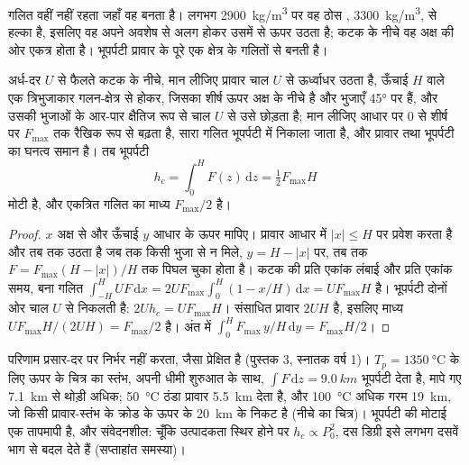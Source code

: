 गलित वहीं नहीं रहता जहाँ वह बनता है। लगभग \qty{2900}{kg/m^3} पर वह
ठोस , \qty{3300}{kg/m^3}, से हल्का है, इसलिए वह अपने
अवशेष से अलग होकर उसमें से ऊपर उठता है; कटक के नीचे वह अक्ष की ओर एकत्र होता है।
भूपर्पटी प्रावार के पूरे एक क्षेत्र के गलितों से बनती है।

\begin{proposition}[त्रिभुजाकार गलन-क्षेत्र की भूपर्पटी]\label{prop:b2:mantle-melting:triangle}
अर्ध-दर $U$ से फैलते कटक के नीचे, मान लीजिए प्रावार
चाल $U$ से ऊर्ध्वाधर उठता है, ऊँचाई $H$ वाले एक त्रिभुजाकार गलन-क्षेत्र से होकर, जिसका शीर्ष ऊपर
अक्ष के नीचे है और भुजाएँ \ang{45} पर हैं, और उसकी भुजाओं के आर-पार क्षैतिज रूप से चाल $U$ से
उसे छोड़ता है; मान लीजिए  आधार पर $0$ से शीर्ष पर
$F_{\max}$ तक रैखिक रूप से बढ़ता है, सारा गलित भूपर्पटी में निकाला जाता है, और प्रावार तथा
भूपर्पटी का घनत्व समान है। तब भूपर्पटी
\[
  h_c = \int_0^H F(z)\,\mathrm dz = \tfrac12 F_{\max}H
\]
मोटी है, और एकत्रित गलित का माध्य  $F_{\max}/2$ है।
\end{proposition}

\begin{proof}
$x$ अक्ष से और ऊँचाई $y$ आधार के ऊपर मापिए। प्रावार आधार में
$|x| \le H$ पर प्रवेश करता है और तब तक उठता है जब तक किसी भुजा से न मिले, $y = H - |x|$ पर, तब तक
$F = F_{\max}(H - |x|)/H$ तक पिघल चुका होता है। कटक की प्रति एकांक लंबाई और प्रति एकांक समय, बना गलित
$\int_{-H}^{H} U F\,\mathrm dx = 2UF_{\max}\int_0^H (1 - x/H)\,\mathrm dx =
UF_{\max}H$ है। भूपर्पटी दोनों ओर चाल $U$ से निकलती है: $2Uh_c = UF_{\max}H$।
संसाधित प्रावार $2UH$ है, इसलिए माध्य  $UF_{\max}H/(2UH) =
F_{\max}/2$ है। अंत में $\int_0^H F_{\max}\,y/H\,\mathrm dy = F_{\max}H/2$।
\end{proof}

परिणाम प्रसार-दर पर निर्भर नहीं करता, जैसा प्रेक्षित है (पुस्तक 3,
स्नातक वर्ष 1)। $T_p = \qty{1350}{\celsius}$ के लिए ऊपर के चित्र का स्तंभ, अपनी
धीमी शुरुआत के साथ, $\int F\,\mathrm dz = \qty{9.0}{km}$ भूपर्पटी देता है, मापे गए
\qty{7.1}{km} से थोड़ी अधिक; \qty{50}{\celsius} ठंडा प्रावार
\qty{5.5}{km} देता है, और \qty{100}{\celsius} अधिक गरम \qty{19}{km}, जो किसी प्रावार-स्तंभ के
क्रोड के ऊपर के \qty{20}{km} के निकट है (नीचे का चित्र)। भूपर्पटी की मोटाई एक
तापमापी है, और संवेदनशील: चूँकि उत्पादकता स्थिर होने पर $h_c \propto P_0^2$,
दस डिग्री इसे लगभग दसवें भाग से बदल देते हैं (सप्ताहांत समस्या)।

